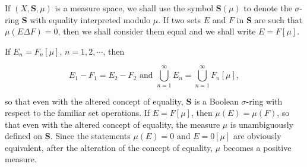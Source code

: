 If $(X, \mathbf{S}, \mu)$ is a measure space, we shall use the symbol $\mathbf{S}(\mu)$ to denote the $\sigma$-ring $\mathbf{S}$ with equality interpreted modulo $\mu$. If two sets $E$ and $F$ in $\mathbf{S}$ are such that $\mu(E \Delta F) = 0$, then we shall consider them equal and we shall write $E = F[\mu]$.

If $E_n = F_n[\mu]$, $n = 1, 2, \cdots$, then

$$E_1 - F_1 = E_2 - F_2 \text{ and } \bigcup_{n=1}^{\infty} E_n = \bigcup_{n=1}^{\infty} F_n[\mu],$$

so that even with the altered concept of equality, $\mathbf{S}$ is a Boolean $\sigma$-ring with respect to the familiar set operations. If $E = F[\mu]$, then $\mu(E) = \mu(F)$, so that even with the altered concept of equality, the measure $\mu$ is unambiguously defined on $\mathbf{S}$. Since the statements $\mu(E) = 0$ and $E = 0[\mu]$ are obviously equivalent, after the alteration of the concept of equality, $\mu$ becomes a positive measure.
